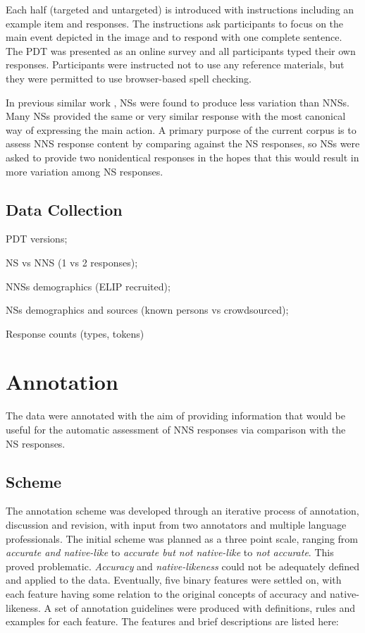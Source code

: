 \documentclass[11pt,a4paper]{article}
\begin{document}
Each half (targeted and untargeted) is introduced with instructions including an example item and responses. The instructions ask participants to focus on the main event depicted in the image and to respond with one complete sentence. The PDT was presented as an online survey and all participants typed their own responses. Participants were instructed not to use any reference materials, but they were permitted to use browser-based spell checking.

In previous similar work \citep{king:dickinson:13,king:dickinson:16}, NSs were found to produce less variation than NNSs. Many NSs provided the same or very similar response with the most canonical way of expressing the main action. A primary purpose of the current corpus is to assess NNS response content by comparing against the NS responses, so NSs were asked to provide two nonidentical responses in the hopes that this would result in more variation among NS responses.

\subsection{Data Collection}
PDT versions;

NS vs NNS (1 vs 2 responses); 

NNSs demographics (ELIP recruited); 

NSs demographics and sources (known persons vs crowdsourced);

Response counts (types, tokens)

\section{Annotation}
The data were annotated with the aim of providing information that would be useful for the automatic assessment of NNS responses via comparison with the NS responses.

\subsection{Scheme}
The annotation scheme was developed through an iterative process of annotation, discussion and revision, with input from two annotators and multiple language professionals. The initial scheme was planned as a three point scale, ranging from \textit{accurate and native-like} to \textit{accurate but not native-like} to \textit{not accurate}. This proved problematic. \textit{Accuracy} and \textit{native-likeness} could not be adequately defined and applied to the data. Eventually, five binary features were settled on, with each feature having some relation to the original concepts of accuracy and native-likeness. A set of annotation guidelines were produced with definitions, rules and examples for each feature. The features and brief descriptions are listed here:
\end{document}
